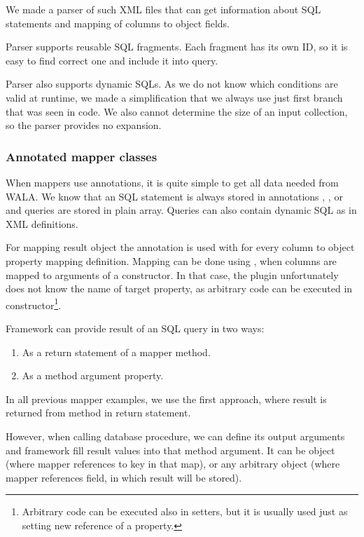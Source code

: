 We made a parser of such XML files that can get information about SQL statements
and mapping of columns to object fields.

Parser supports reusable SQL fragments. Each fragment has its own ID,
so it is easy to find correct one and include it into query.

Parser also supports dynamic SQLs. As we do not know which conditions are valid
at runtime, we made a simplification that we always use just first branch that
was seen in code.
We also cannot determine the size of an input collection, so the parser provides no expansion.



\subsubsection{Annotated mapper classes}

When mappers use annotations, it is quite simple to get all data needed
from WALA. We know that an SQL statement is always stored in annotations
, ,  or 
and queries are stored in plain  array.
Queries can also contain dynamic SQL as in XML definitions.

For mapping result object the  annotation is used with 
for every column to object property mapping definition.
Mapping can be done using , when columns are mapped
to arguments of a constructor. In that case, the plugin unfortunately does not know
the name of target property, as arbitrary code can be executed in constructor\footnote{
  Arbitrary code can be executed also in setters, but it is usually used
  just as setting new reference of a property.
}.

Framework can provide result of an SQL query in two ways:
\begin{enumerate}
  \item As a return statement of a mapper method.
  \item As a method argument property.
\end{enumerate}

In all previous mapper examples, we use the first approach, where result
is returned from method in return statement.

However, when calling database procedure, we can define its output arguments
and framework fill result values into that method argument.
It can be  object (where mapper references to key in that map),
or any arbitrary object (where mapper references field, in which result will be stored).

